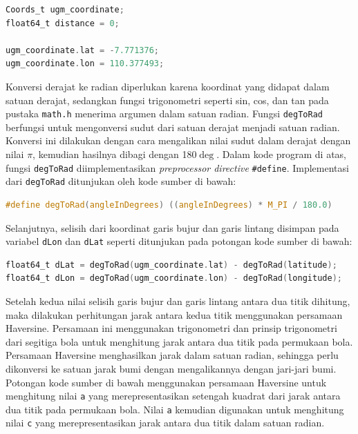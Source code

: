 \begin{lstlisting}[language=c]
Coords_t ugm_coordinate;
float64_t distance = 0;

ugm_coordinate.lat = -7.771376;
ugm_coordinate.lon = 110.377493;
\end{lstlisting}

Konversi derajat ke radian diperlukan karena koordinat yang didapat dalam satuan derajat, sedangkan fungsi trigonometri seperti sin, cos, dan tan pada pustaka \texttt{math.h} menerima argumen dalam satuan radian. Fungsi  \texttt{degToRad} berfungsi untuk mengonversi sudut dari satuan derajat menjadi satuan radian. Konversi ini dilakukan dengan cara mengalikan nilai sudut dalam derajat dengan nilai $\pi$, kemudian hasilnya dibagi dengan 180$\deg$. Dalam kode program di atas, fungsi \texttt{degToRad} diimplementasikan \textit{preprocessor directive} \texttt{\#define}. Implementasi dari \texttt{degToRad} ditunjukan oleh kode sumber di bawah:

\begin{lstlisting}[language=c]
	#define degToRad(angleInDegrees) ((angleInDegrees) * M_PI / 180.0)
\end{lstlisting}

Selanjutnya, selisih dari koordinat garis bujur dan garis lintang disimpan pada variabel \texttt{dLon} dan \texttt{dLat} seperti ditunjukan pada potongan kode sumber di bawah:

\begin{lstlisting}[language=c]
float64_t dLat = degToRad(ugm_coordinate.lat) - degToRad(latitude);
float64_t dLon = degToRad(ugm_coordinate.lon) - degToRad(longitude);
\end{lstlisting}

Setelah kedua nilai selisih garis bujur dan garis lintang antara dua titik dihitung, maka dilakukan perhitungan jarak antara kedua titik menggunakan persamaan Haversine. Persamaan ini menggunakan trigonometri dan prinsip trigonometri dari segitiga bola untuk menghitung jarak antara dua titik pada permukaan bola. Persamaan Haversine menghasilkan jarak dalam satuan radian, sehingga perlu dikonversi ke satuan jarak bumi dengan mengalikannya dengan jari-jari bumi. Potongan kode sumber di bawah menggunakan persamaan Haversine untuk menghitung nilai \texttt{a} yang merepresentasikan setengah kuadrat dari jarak antara dua titik pada permukaan bola. Nilai \texttt{a} kemudian digunakan untuk menghitung nilai \texttt{c} yang merepresentasikan jarak antara dua titik dalam satuan radian.


